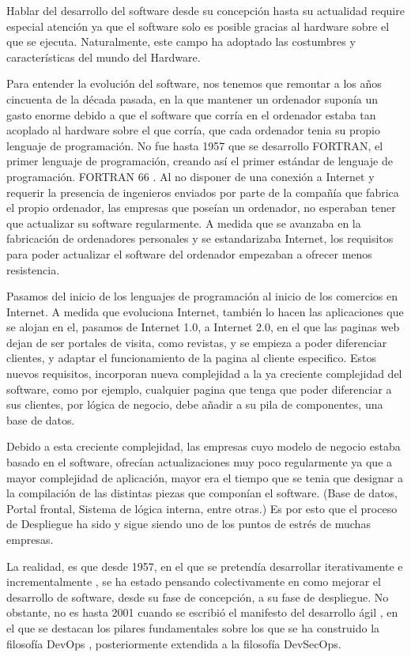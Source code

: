\documentclass[12pt]{report} %
\begin{document}
Hablar del desarrollo del software desde su concepción hasta su actualidad
require especial atención ya que el software solo es posible gracias al hardware
sobre el que se ejecuta.  Naturalmente, este campo ha adoptado las costumbres y
características del mundo del Hardware.

Para entender la evolución del software, nos tenemos que remontar a los años
cincuenta de la década pasada, en la que mantener un ordenador suponía un gasto
enorme debido a que el software que corría en el ordenador estaba tan acoplado
al hardware sobre el que corría, que cada ordenador tenia su propio lenguaje de
programación.  No fue hasta 1957 que se desarrollo FORTRAN, el primer lenguaje
de programación, creando así el primer estándar de lenguaje de programación.
FORTRAN 66 \cite{FORTRAN1966}.  Al no disponer de una conexión a Internet y
requerir la presencia de ingenieros enviados por parte de la compañía que
fabrica el propio ordenador, las empresas que poseían un ordenador, no esperaban
tener que actualizar su software regularmente.  A medida que se avanzaba en la
fabricación de ordenadores personales y se estandarizaba Internet, los
requisitos para poder actualizar el software del ordenador empezaban a ofrecer
menos resistencia.

Pasamos del inicio de los lenguajes de programación al inicio de los comercios
en Internet.  A medida que evoluciona Internet, también lo hacen las
aplicaciones que se alojan en el, pasamos de Internet 1.0, a  Internet 2.0, en
el que las paginas web dejan de ser portales de visita, como revistas, y se
empieza a poder diferenciar clientes, y adaptar el funcionamiento de la pagina
al cliente especifico.  Estos nuevos requisitos, incorporan nueva complejidad a
la ya creciente complejidad del software, como por ejemplo, cualquier pagina que
tenga que poder diferenciar a sus clientes, por lógica de negocio, debe añadir a
su pila de componentes, una base de datos.

Debido a esta creciente complejidad, las empresas cuyo modelo de negocio estaba
basado en el software, ofrecían actualizaciones muy poco regularmente ya que a
mayor complejidad de aplicación, mayor era el tiempo que se tenia que designar a
la compilación de las distintas piezas que componían el software. (Base de
datos, Portal frontal, Sistema de lógica interna, entre otras.) Es por esto que
el proceso de Despliegue ha sido y sigue siendo uno de los puntos de estrés de
muchas empresas.

La realidad, es que desde 1957, en el que se pretendía desarrollar
iterativamente e incrementalmente \cite{IID}, se ha estado pensando
colectivamente en como mejorar el desarrollo de software, desde su fase de
concepción, a su fase de despliegue.  No obstante, no es hasta 2001 cuando se
escribió el manifesto del desarrollo ágil \cite{agile}, en el que se destacan
los pilares fundamentales sobre los que se ha construido la filosofía DevOps
\cite{CD-TF}, posteriormente extendida a la filosofía DevSecOps.
\end{document}
